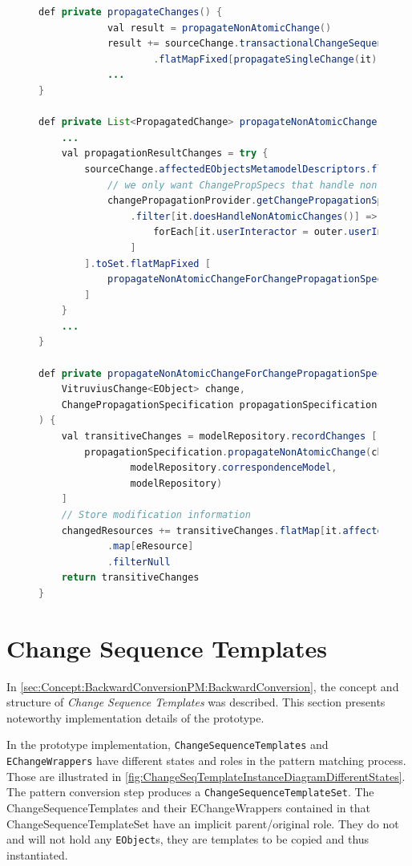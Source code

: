 \begin{figure}[H]
\centering
\begin{lstlisting}[language=java, caption={Excerpts of changes to methods in \emph{ChangePropagator.xtend}, enabling change sequence propagation}, captionpos=b, label=implChangePropagator]
def private propagateChanges() {
		    val result = propagateNonAtomicChange()
			result += sourceChange.transactionalChangeSequence
                    .flatMapFixed[propagateSingleChange(it)]
            ...
}

def private List<PropagatedChange> propagateNonAtomicChange() {
    ...
    val propagationResultChanges = try {
        sourceChange.affectedEObjectsMetamodelDescriptors.flatMap [
            // we only want ChangePropSpecs that handle non-atomic changes
            changePropagationProvider.getChangePropagationSpecifications(it)
                .filter[it.doesHandleNonAtomicChanges()] => [
                    forEach[it.userInteractor = outer.userInteractor]
                ]
        ].toSet.flatMapFixed [
            propagateNonAtomicChangeForChangePropagationSpecification(sourceChange, it)
        ]
    }
    ...
}

def private propagateNonAtomicChangeForChangePropagationSpecification(
    VitruviusChange<EObject> change,
    ChangePropagationSpecification propagationSpecification
) {
    val transitiveChanges = modelRepository.recordChanges [
        propagationSpecification.propagateNonAtomicChange(change, 
                modelRepository.correspondenceModel,
                modelRepository)
    ]
    // Store modification information
    changedResources += transitiveChanges.flatMap[it.affectedEObjects]
            .map[eResource]
            .filterNull
    return transitiveChanges
}
\end{lstlisting}
\end{figure}

\section{Change Sequence Templates}
\label{sec:Implementation:ChangesSequenceTemplates}
In \autoref{sec:Concept:BackwardConversionPM:BackwardConversion}, the concept and structure of \emph{Change Sequence Templates} was described. This section presents noteworthy implementation details of the prototype.

In the prototype implementation, \texttt{ChangeSequenceTemplates} and \texttt{EChangeWrappers} have different states and roles in the pattern matching process. Those are illustrated in \autoref{fig:ChangeSeqTemplateInstanceDiagramDifferentStates}. The pattern conversion step produces a \texttt{ChangeSequenceTemplateSet}. The ChangeSequenceTemplates and their EChangeWrappers contained in that ChangeSequenceTemplateSet have an implicit parent/original role. They do not and will not hold any \texttt{EObject}s, they are templates to be copied and thus instantiated.

